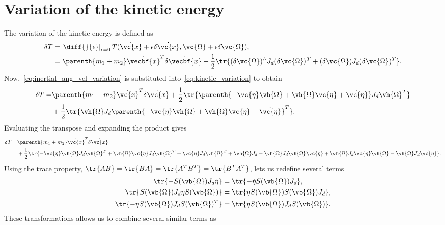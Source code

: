 \section{Variation of the kinetic energy}\label{sec:inertial_kinetic_energy_variation}
The variation of the kinetic energy is defined as
\begin{align}
    \delta T &= \left. \diff{}{\epsilon}\right|_{\epsilon=0} T(\dot{\vc{x}} + \epsilon \delta \dot{\vc{x}}, \vc{\Omega} + \epsilon \delta \vc{\Omega}), \nonumber\\
             &=   \parenth{m_1 + m_2} \dot{\vecbf{x}}^T \delta \dot{\vecbf{x}} + \frac{1}{2} \tr{ (\delta \vc{\Omega} )^\wedge J_d (\delta \vc{\Omega} )^T + (\delta \vc{\Omega})J_d (\delta \vc{\Omega})^T}\label{eq:kinetic_variation}.
\end{align}
Now,~\cref{eq:inertial_ang_vel_variation} is substituted into~\cref{eq:kinetic_variation} to obtain
\begin{align*}
    \delta T =&  \parenth{m_1 + m_2} \dot{\vc{x}}^T \delta \dot{\vc{x}} + \frac{1}{2} \tr{\parenth{-\vc{\eta} \vh{\Omega} + \vh{\Omega} \vc{\eta} + \dot{\vc{\eta}}} J_d \vh{\Omega}^T} \nonumber \\
              &+ \frac{1}{2} \tr{\vh{\Omega} J_d \parenth{-\vc{\eta} \vh{\Omega} + \vh{\Omega} \vc{\eta} + \dot{\vc{\eta}}}^T} .
\end{align*}
Evaluating the transpose and expanding the product gives
\begin{align*}
    \delta T =&  \parenth{m_1 + m_2} \dot{\vc{x}}^T \delta \dot{\vc{x}} \\
              &+ \frac{1}{2} \tr{ -\vc{\eta} \vh{\Omega} J_d \vh{\Omega}^T + \vh{\Omega} \vc{\eta} J_d \vh{\Omega}^T + \dot{\vc{\eta}} J_d \vh{\Omega}^T + \vh{\Omega} J_d -\vh{\Omega} J_d \vh{\Omega} \vc{\eta} + \vh{\Omega} J_d \vc{\eta} \vh{\Omega} - \vh{\Omega} J_d \dot{\vc{\eta}}}.
\end{align*}
Using the trace property, \( \tr{AB} = \tr{BA} = \tr{A^T B^T} = \tr{B^T A^T} \), lets us redefine several terms
\begin{align*}
    \tr{-S(\vb{\Omega}) J_d \dot{\eta}} &= \tr{- \dot{\eta} S(\vb{\Omega}) J_d} , \\
    \tr{S(\vb{\Omega}) J_d \eta S(\vb{\Omega})} &= \tr{\eta S(\vb{\Omega}) S(\vb{\Omega}) J_d} , \\
    \tr{-\eta S(\vb{\Omega}) J_d S(\vb{\Omega})^T} &= \tr{\eta S(\vb{\Omega}) J_d S(\vb{\Omega})} .
\end{align*}
These transformations allows us to combine several similar terms as
